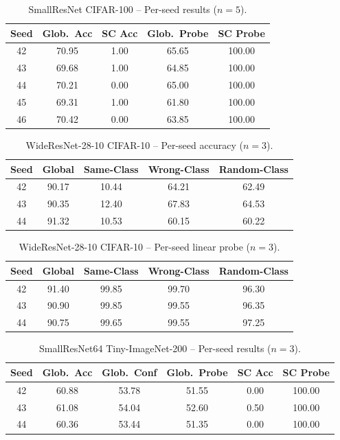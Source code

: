 \documentclass{article}
\begin{document}
\begin{table}[h]
\caption{SmallResNet CIFAR-100 -- Per-seed results ($n{=}5$).}
\label{tab:perseed_cifar100}
\centering
\small
\begin{tabular}{@{}ccccc@{}}
\toprule
Seed & Glob.\ Acc & SC Acc & Glob.\ Probe & SC Probe \\
\midrule
42 & 70.95 & 1.00 & 65.65 & 100.00 \\
43 & 69.68 & 1.00 & 64.85 & 100.00 \\
44 & 70.21 & 0.00 & 65.00 & 100.00 \\
45 & 69.31 & 1.00 & 61.80 & 100.00 \\
46 & 70.42 & 0.00 & 63.85 & 100.00 \\
\bottomrule
\end{tabular}
\end{table}

\begin{table}[h]
\caption{WideResNet-28-10 CIFAR-10 -- Per-seed accuracy ($n{=}3$).}
\label{tab:perseed_wrn_acc}
\centering
\small
\begin{tabular}{@{}ccccc@{}}
\toprule
Seed & Global & Same-Class & Wrong-Class & Random-Class \\
\midrule
42 & 90.17 & 10.44 & 64.21 & 62.49 \\
43 & 90.35 & 12.40 & 67.83 & 64.53 \\
44 & 91.32 & 10.53 & 60.15 & 60.22 \\
\bottomrule
\end{tabular}
\end{table}

\begin{table}[h]
\caption{WideResNet-28-10 CIFAR-10 -- Per-seed linear probe ($n{=}3$).}
\label{tab:perseed_wrn_probe}
\centering
\small
\begin{tabular}{@{}ccccc@{}}
\toprule
Seed & Global & Same-Class & Wrong-Class & Random-Class \\
\midrule
42 & 91.40 & 99.85 & 99.70 & 96.30 \\
43 & 90.90 & 99.85 & 99.55 & 96.35 \\
44 & 90.75 & 99.65 & 99.55 & 97.25 \\
\bottomrule
\end{tabular}
\end{table}

\begin{table}[h]
\caption{SmallResNet64 Tiny-ImageNet-200 -- Per-seed results ($n{=}3$).}
\label{tab:perseed_tinyim}
\centering
\small
\begin{tabular}{@{}cccccc@{}}
\toprule
Seed & Glob.\ Acc & Glob.\ Conf & Glob.\ Probe & SC Acc & SC Probe \\
\midrule
42 & 60.88 & 53.78 & 51.55 & 0.00 & 100.00 \\
43 & 61.08 & 54.04 & 52.60 & 0.50 & 100.00 \\
44 & 60.36 & 53.44 & 51.35 & 0.00 & 100.00 \\
\bottomrule
\end{tabular}
\end{table}
\end{document}
